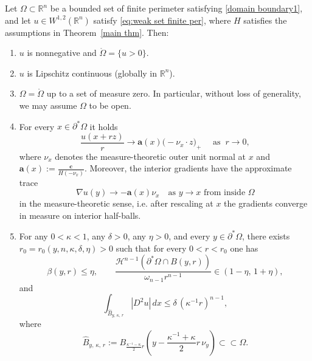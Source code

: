 \documentclass[10pt,a4paper]{amsart}
\begin{document}
\begin{lem}\label{basic property u}
Let $\Omega\subset \mathbb R^n$ be a bounded set of finite perimeter satisfying \eqref{domain boundary1},
and let $u \in W^{1,2}(\mathbb R^n)$ satisfy \eqref{eq:weak set finite per}, where $H$ satisfies the assumptions in Theorem~\ref{main thm}.
Then:
\begin{enumerate}
\item[(1)] $u$ is nonnegative and $\mathring\Omega=\{u>0\}$.

\item[(2)] $u$ is {Lipschitz continuous} (globally in $\mathbb R^n$).

\item[(3)] $\Omega=\mathring\Omega$ up to a set of measure zero. In particular, without loss of generality, we may assume
$\Omega$ to be open.

\item[(4)] For every $x\in \partial^*\Omega$ it holds
\[
\frac{u(x+rz)}{r} \to  \mathbf{a}(x)\bigl(-\nu_x\cdot z \bigr)_+ \quad \text{ as } \ r\to 0,
\]
where $\nu_x$ denotes the measure-theoretic outer unit normal at $x$ and $\mathbf {a}(x):=\frac{\mathbf c}{H(-\nu_x)}$.
{Moreover, the interior gradients have the approximate trace
\[
\nabla u(y)\to -\mathbf a(x)\nu_x
\quad\text{as } y\to x \text{ from inside }\Omega
\]
in the measure-theoretic sense, i.e. after rescaling at $x$ the gradients converge in measure on interior half-balls.}

\item[(5)] For any $0<\kappa<1$, any $\delta>0$, any $\eta>0$, and every $y\in \partial^*\Omega$, there exists
$r_0=r_0(y,n,\kappa,\delta,\eta)>0$ such that for every $0<r<r_0$ one has
\[
\beta(y,r)\le \eta,
\qquad
\frac{\mathscr {H}^{n-1}(\partial^*\Omega\cap B(y,r))}{\omega_{n-1}r^{n-1}}\in (1-\eta,\,1+\eta),
\]
and
\[
\int_{\hat B_{y,\,\kappa,\, r}}|D^2u|\, dx\le \delta \,(\kappa^{-1} r)^{n-1},
\]
where
\[
\hat B_{y,\,\kappa,\, r}:=
B_{\frac{\kappa^{-1}-\kappa}{2}r}\!\left(y-\frac{\kappa^{-1}+\kappa}{2}r\,\nu_y\right){\subset\subset \Omega}.
\]
\end{enumerate}
\end{lem}
\end{document}
